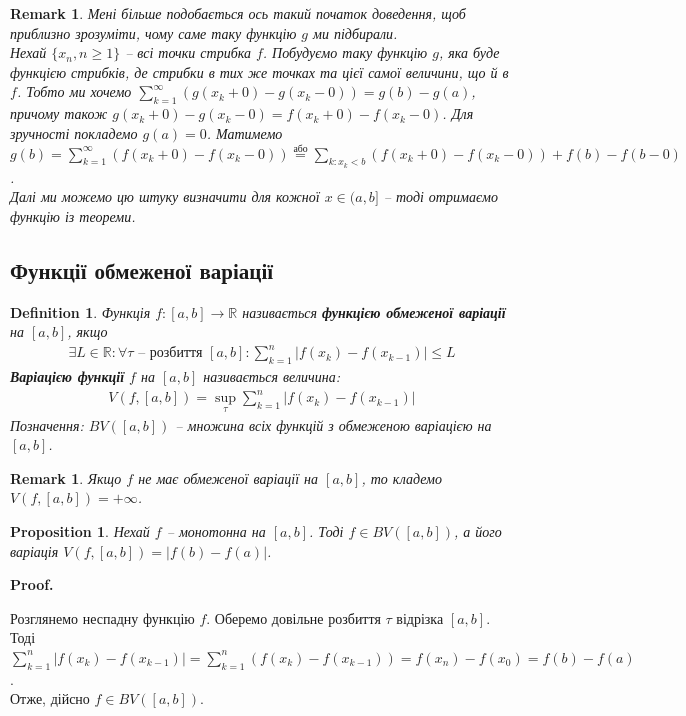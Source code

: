 \documentclass[a4paper, 10pt]{article}
\makeatletter
\theoremstyle{theoremdd}
\theoremstyle{theoremdd}
\theoremstyle{theoremdd}
\newtheorem{definition}[theorem]{Definition}
\theoremstyle{theoremdd}
\theoremstyle{theoremdd}
\theoremstyle{theoremdd}
\newtheorem{proposition}[theorem]{Proposition}
\theoremstyle{theoremdd}
\newtheorem{remark}[theorem]{Remark}
\theoremstyle{theoremdd}
\theoremstyle{theoremdd}
\renewenvironment{proof}[1][Proof.\\]{\par
\pushQED{\hfill \qed}%
\normalfont \topsep6\p@\@plus6\p@\relax
\trivlist
\item\relax
{\bfseries
#1\@addpunct{.}}\hspace\labelsep\ignorespaces
}{%
\popQED\endtrivlist\@endpefalse
}
\makeatother
\begin{document}
\begin{remark}
Мені більше подобається ось такий початок доведення, щоб приблизно зрозуміти, чому саме таку функцію $g$ ми підбирали.\\
Нехай $\{x_n, n \geq 1\}$ -- всі точки стрибка $f$. Побудуємо таку функцію $g$, яка буде функцією стрибків, де стрибки в тих же точках та цієї самої величини, що й в $f$. Тобто ми хочемо $\displaystyle\sum_{k=1}^\infty (g(x_k+0) - g(x_k-0)) = g(b) - g(a)$, причому також $g(x_k+0) - g(x_k-0) = f(x_k+0) - f(x_k-0)$. Для зручності покладемо $g(a) = 0$. Матимемо $g(b) = \displaystyle\sum_{k=1}^\infty (f(x_k+0) - f(x_k-0)) \overset{\text{або}}{=} \sum_{k: x_k < b} (f(x_k+0) - f(x_k-0)) + f(b) - f(b-0)$.\\
Далі ми можемо цю штуку визначити для кожної $x \in (a,b]$ -- тоді отримаємо функцію із теореми.
\end{remark}

\subsection{Функції обмеженої варіації}
\begin{definition}
Функція $f \colon [a,b] \to \mathbb{R}$ називається \textbf{функцією обмеженої варіації} на $[a,b]$, якщо
\begin{align*}
\exists L \in \mathbb{R}: \forall \tau \text{ -- розбиття } [a,b]: \sum_{k=1}^{n} |f(x_{k}) - f(x_{k-1})| \leq L
\end{align*}
\textbf{Варіацією функції} $f$ на $[a,b]$ називається величина:
\begin{align*}
V(f,[a,b]) = \sup_{\tau} \sum_{k=1}^{n} |f(x_{k}) - f(x_{k-1})|
\end{align*}
Позначення: $BV([a,b])$ -- множина всіх функцій з обмеженою варіацією на $[a,b]$.
\end{definition}

\begin{remark}
Якщо $f$ не має обмеженої варіації на $[a,b]$, то кладемо $V(f,[a,b]) = +\infty$.
\end{remark}

\begin{proposition}
Нехай $f$ -- монотонна на $[a,b]$. Тоді $f \in BV([a,b])$, а його варіація $V(f,[a,b]) = |f(b) - f(a)|$.
\end{proposition}

\begin{proof}
Розглянемо неспадну функцію $f$. Оберемо довільне розбиття $\tau$ відрізка $[a,b]$. Тоді\\
$\displaystyle\sum_{k=1}^{n} |f(x_{k}) - f(x_{k-1})| = \sum_{k=1}^{n} (f(x_{k}) - f(x_{k-1})) = f(x_n) - f(x_0) = f(b) - f(a)$.\\
Отже, дійсно $f \in BV([a,b])$.
\end{proof}
\end{document}
